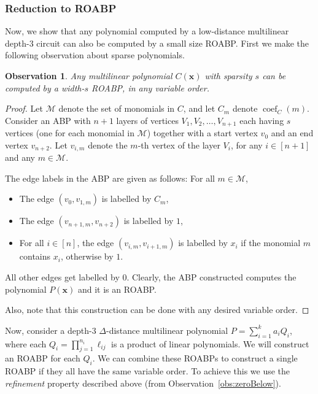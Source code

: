 \documentclass[final,oneeqnum, onethmnum, onefignum]{siamltex1213}
\newcommand{\M}{\mathcal M}
\newcommand{\di}{\Delta} %
\newcommand{\coeff}{\operatorname{coef}}
\newtheorem{observation}[theorem]{Observation}
\begin{document}
\subsubsection{Reduction to ROABP}
Now, we show that any polynomial computed by a low-distance multilinear 
depth-$3$ circuit can also be computed by a small size ROABP. 
First we make the following observation about sparse polynomials. 

\begin{observation}
\label{obs:sparse}
Any multilinear polynomial $C(\mathbf{x})$ with sparsity $s$
can be computed by a width-$s$ ROABP, in any variable order. 
\end{observation}
\begin{proof}
Let $\M$ denote the set of monomials in $C$, and 
let $C_m$ denote $\coeff_C(m)$.
Consider an ABP with 
$n+1$ layers of vertices $V_1, V_2, \dots, V_{n+1}$ each having
$s$ vertices (one for each monomial in $\M$)
 together with a start vertex $v_0$ and an end 
vertex $v_{n+2}$.
Let $v_{i,m}$ denote the $m$-th vertex of the layer $V_i$,
for any $i \in [n+1]$ and any $m \in \M$.

The edge labels in the ABP are given as follows:
For all $m \in \M$,
\begin{itemize} 
\item The edge $(v_0, v_{1,m})$ is labelled by $C_m$,
\item The edge $(v_{n+1, m}, v_{n+2})$ is labelled by $1$,
\item For all $i \in [n]$, 
the edge $(v_{i,m}, v_{i+1,m})$ is labelled by $x_i$ if the monomial
$m$ contains $x_i$, otherwise by $1$.
\end{itemize}
All other edges get labelled by $0$.
Clearly, the ABP constructed computes the polynomial $P(\mathbf{x})$ 
and it is an ROABP.

Also, note that this construction can be done with any desired variable order.
\end{proof}

Now, consider a depth-$3$ $\di$-distance multilinear polynomial 
$P = \sum_{i = 1}^k a_i Q_i$, where each $Q_i = \prod_{j=1}^{n_i} \ell_{ij}$ 
is a product of linear polynomials. 
We will construct an ROABP for each $Q_i$. 
We can combine these ROABPs to construct a single ROABP 
if they all have the same variable order. 
To achieve this we use the {\em refinement} property 
described above (from Observation~\ref{obs:zeroBelow}).
\end{document}
